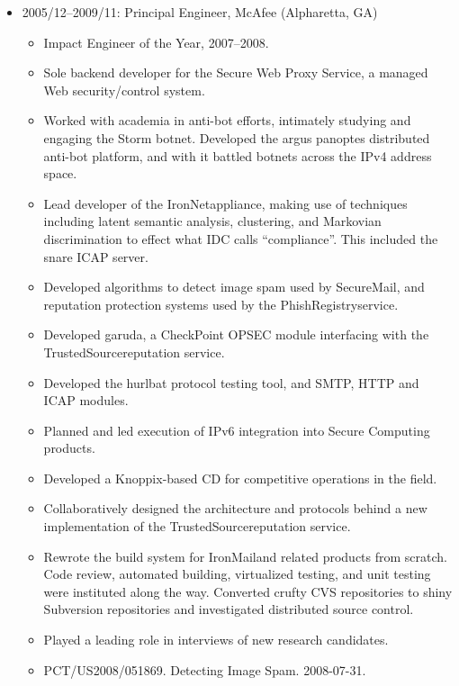 \documentclass{article}
\newenvironment{tightitemize}
{\begin{itemize}
  \setlength{\itemsep}{1pt}
  \setlength{\parskip}{0pt}
  \setlength{\parsep}{0pt}}
{\end{itemize}}
\begin{document}
\begin{tightitemize}
\item 2005/12--2009/11: Principal Engineer, McAfee (Alpharetta, GA)
\begin{tightitemize}
\item Impact Engineer of the Year, 2007--2008.
\item Sole backend developer for the Secure Web Proxy Service, a managed Web
  security/control system.
\item Worked with academia in anti-bot efforts, intimately studying and engaging
  the Storm botnet. Developed the argus panoptes distributed anti-bot
  platform, and with it battled botnets across the IPv4 address space.
\item Lead developer of the IronNet\texttrademark appliance, making use of techniques
  including latent semantic analysis, clustering, and Markovian discrimination
  to effect what IDC calls ``compliance''. This included the snare ICAP server.
\item Developed algorithms to detect image spam used by SecureMail\texttrademark, and
  reputation protection systems used by the PhishRegistry\texttrademark service.
\item Developed garuda, a CheckPoint\textsuperscript{\textregistered} OPSEC module interfacing with the
  TrustedSource\texttrademark reputation service.
\item Developed the hurlbat protocol testing tool, and SMTP, HTTP and ICAP modules.
\item Planned and led execution of IPv6 integration into Secure Computing products.
\item Developed a Knoppix\textsuperscript{\textregistered}-based CD for competitive operations in the field.
\item Collaboratively designed the architecture and protocols behind a new
  implementation of the TrustedSource\texttrademark reputation service.
\item Rewrote the build system for IronMail\texttrademark and related products from scratch.
  Code review, automated building, virtualized testing, and unit testing were
  instituted along the way. Converted crufty CVS repositories to shiny
  Subversion repositories and investigated distributed source control.
\item Played a leading role in interviews of new research candidates.
\item PCT/US2008/051869. Detecting Image Spam. 2008-07-31.
\end{tightitemize}


\end{tightitemize}
\end{document}

